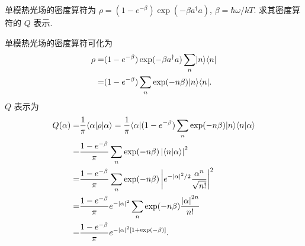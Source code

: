 \documentclass{assignment}
\begin{document}
\begin{prob}
    单模热光场的密度算符为 $\rho=(1-e^{-\beta})\exp(-\beta a^{\dagger}a)$, $\beta=\hbar\omega/kT$. 求其密度算符的 $Q$ 表示.
\end{prob}
\begin{sol}
    单模热光场的密度算符可化为
    \begin{align}
        \notag\rho=&(1-e^{-\beta})\exp(-\beta a^{\dagger}a)\sum_n\lvert n\rangle\langle n\rvert\\
        \notag=&(1-e^{-\beta})\sum_n\exp(-n\beta)\lvert n\rangle\langle n\rvert.
    \end{align}
    $Q$ 表示为
    \begin{align}
        \notag Q(\alpha)=&\frac{1}{\pi}\langle\alpha\rvert\rho\lvert\alpha\rangle=\frac{1}{\pi}\langle\alpha\rvert(1-e^{-\beta})\sum_n\exp(-n\beta)\lvert n\rangle\langle n\vert\alpha\rangle\\
        \notag=&\frac{1-e^{-\beta}}{\pi}\sum_n\exp(-n\beta)\left\lvert\langle n\vert\alpha\rangle\right\rvert^2\\
        \notag=&\frac{1-e^{-\beta}}{\pi}\sum_n\exp(-n\beta)\left\lvert e^{-\left\lvert\alpha\right\rvert^2/2}\frac{\alpha^n}{\sqrt{n!}}\right\rvert^2\\
        \notag=&\frac{1-e^{-\beta}}{\pi}e^{-\left\lvert\alpha\right\rvert^2}\sum_n\exp(-n\beta)\frac{\left\lvert\alpha\right\rvert^{2n}}{n!}\\
        =&\frac{1-e^{-\beta}}{\pi}e^{-\left\lvert\alpha\right\rvert^2[1+\exp(-\beta)]}.
    \end{align}
\end{sol}
\end{document}
